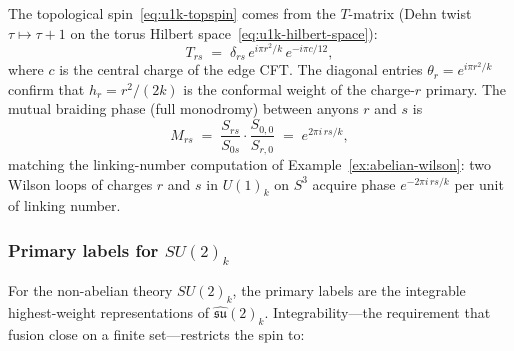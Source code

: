 \noindent
The topological spin~\eqref{eq:u1k-topspin} comes from the $T$-matrix
(Dehn twist $\tau \mapsto \tau + 1$ on the torus Hilbert
space~\eqref{eq:u1k-hilbert-space}):
\begin{equation}
\label{eq:t-matrix-u1k}
    T_{rs} \;=\; \delta_{rs}\, e^{i\pi r^2/k}\, e^{-i\pi c/12},
\end{equation}
where $c$ is the central charge of the edge CFT.  The diagonal entries
$\theta_r = e^{i\pi r^2/k}$ confirm that $h_r = r^2/(2k)$ is the conformal
weight of the charge-$r$ primary.  The mutual braiding phase (full monodromy)
between anyons $r$ and $s$ is
\begin{equation}
\label{eq:u1k-mutual-braiding}
    M_{rs} \;=\; \frac{S_{rs}}{S_{0s}} \cdot \frac{S_{0,0}}{S_{r,0}}
    \;=\; e^{2\pi i\, rs/k},
\end{equation}
matching the linking-number computation of Example~\ref{ex:abelian-wilson}:
two Wilson loops of charges $r$ and $s$ in $U(1)_k$ on $S^3$ acquire phase
$e^{-2\pi i\, rs/k}$ per unit of linking number.

\subsubsection*{Primary labels for $SU(2)_k$}

For the non-abelian theory $SU(2)_k$, the primary labels are the integrable
highest-weight representations of $\widehat{\mathfrak{su}}(2)_k$.
Integrability---the requirement that fusion close on a finite set---restricts
the spin to:

